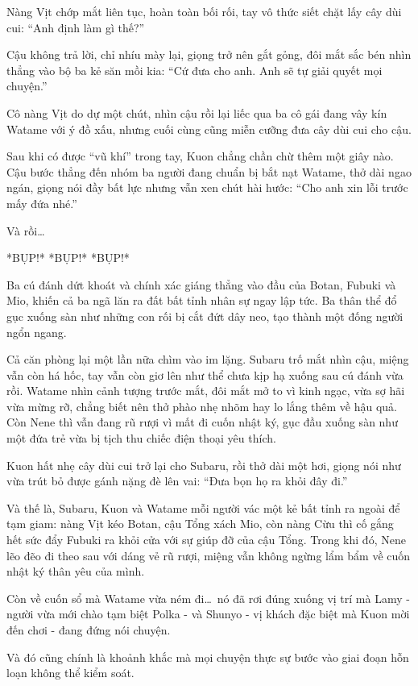 \documentclass[../main.tex]{subfiles}
\begin{document}
Nàng Vịt chớp mắt liên tục, hoàn toàn bối rối, tay vô thức siết chặt lấy cây dùi cui: ``Anh định làm gì thế?''

Cậu không trả lời, chỉ nhíu mày lại, giọng trở nên gắt gỏng, đôi mắt sắc bén nhìn thẳng vào bộ ba kẻ săn mồi kia: ``Cứ đưa cho anh. Anh sẽ tự giải quyết mọi chuyện.''

Cô nàng Vịt do dự một chút, nhìn cậu rồi lại liếc qua ba cô gái đang vây kín Watame với ý đồ xấu, nhưng cuối cùng cũng miễn cưỡng đưa cây dùi cui cho cậu.

Sau khi có được ``vũ khí'' trong tay, Kuon chẳng chần chừ thêm một giây nào. Cậu bước thẳng đến nhóm ba người đang chuẩn bị bắt nạt Watame, thở dài ngao ngán, giọng nói đầy bất lực nhưng vẫn xen chút hài hước: ``Cho anh xin lỗi trước mấy đứa nhé.''

Và rồi\dots

*BỤP!* *BỤP!* *BỤP!*

Ba cú đánh dứt khoát và chính xác giáng thẳng vào đầu của Botan, Fubuki và Mio, khiến cả ba ngã lăn ra đất bất tỉnh nhân sự ngay lập tức. Ba thân thể đổ gục xuống sàn như những con rối bị cắt đứt dây neo, tạo thành một đống người ngổn ngang.

Cả căn phòng lại một lần nữa chìm vào im lặng. Subaru trố mắt nhìn cậu, miệng vẫn còn há hốc, tay vẫn còn giơ lên như thể chưa kịp hạ xuống sau cú đánh vừa rồi. Watame nhìn cảnh tượng trước mắt, đôi mắt mở to vì kinh ngạc, vừa sợ hãi vừa mừng rỡ, chẳng biết nên thở phào nhẹ nhõm hay lo lắng thêm về hậu quả. Còn Nene thì vẫn đang rũ rượi vì mất đi cuốn nhật ký, gục đầu xuống sàn như một đứa trẻ vừa bị tịch thu chiếc điện thoại yêu thích.

Kuon hất nhẹ cây dùi cui trở lại cho Subaru, rồi thở dài một hơi, giọng nói như vừa trút bỏ được gánh nặng đè lên vai: ``Đưa bọn họ ra khỏi đây đi.''

Và thế là, Subaru, Kuon và Watame mỗi người vác một kẻ bất tỉnh ra ngoài để tạm giam: nàng Vịt kéo Botan, cậu Tổng xách Mio, còn nàng Cừu thì cố gắng hết sức đẩy Fubuki ra khỏi cửa với sự giúp đỡ của cậu Tổng. Trong khi đó, Nene lẽo đẽo đi theo sau với dáng vẻ rũ rượi, miệng vẫn không ngừng lẩm bẩm về cuốn nhật ký thân yêu của mình.

Còn về cuốn sổ mà Watame vừa ném đi\dots\ nó đã rơi đúng xuống vị trí mà Lamy - người vừa mới chào tạm biệt Polka - và Shunyo - vị khách đặc biệt mà Kuon mời đến chơi - đang đứng nói chuyện.

Và đó cũng chính là khoảnh khắc mà mọi chuyện thực sự bước vào giai đoạn hỗn loạn không thể kiểm soát.
\end{document}
